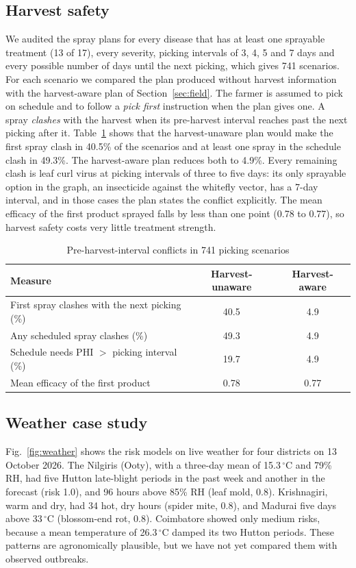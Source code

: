 \documentclass[conference]{IEEEtran}
\begin{document}
\subsection{Harvest safety}
We audited the spray plans for every disease that has at least one sprayable treatment (13 of 17), every severity, picking intervals of 3, 4, 5 and 7 days and every possible number of days until the next picking, which gives 741 scenarios. For each scenario we compared the plan produced without harvest information with the harvest-aware plan of Section~\ref{sec:field}. The farmer is assumed to pick on schedule and to follow a \emph{pick first} instruction when the plan gives one. A spray \emph{clashes} with the harvest when its pre-harvest interval reaches past the next picking after it. Table~\ref{tab:phi} shows that the harvest-unaware plan would make the first spray clash in 40.5\% of the scenarios and at least one spray in the schedule clash in 49.3\%. The harvest-aware plan reduces both to 4.9\%. Every remaining clash is leaf curl virus at picking intervals of three to five days: its only sprayable option in the graph, an insecticide against the whitefly vector, has a 7-day interval, and in those cases the plan states the conflict explicitly. The mean efficacy of the first product sprayed falls by less than one point (0.78 to 0.77), so harvest safety costs very little treatment strength.

\begin{table}[t]
  \caption{Pre-harvest-interval conflicts in 741 picking scenarios}
  \label{tab:phi}
  \centering
  \footnotesize
  \setlength{\tabcolsep}{3pt}
  \begin{tabular}{@{}>{\raggedright\arraybackslash}p{4.3cm}cc@{}}
    \toprule
    Measure & Harvest-unaware & Harvest-aware \\
    \midrule
    First spray clashes with the next picking (\%) & 40.5 & 4.9 \\
    Any scheduled spray clashes (\%) & 49.3 & 4.9 \\
    Schedule needs PHI $>$ picking interval (\%) & 19.7 & 4.9 \\
    Mean efficacy of the first product & 0.78 & 0.77 \\
    \bottomrule
  \end{tabular}
\end{table}

\subsection{Weather case study}
Fig.~\ref{fig:weather} shows the risk models on live weather for four districts on 13 October 2026. The Nilgiris (Ooty), with a three-day mean of 15.3\,$^\circ$C and 79\% RH, had five Hutton late-blight periods in the past week and another in the forecast (risk 1.0), and 96 hours above 85\% RH (leaf mold, 0.8). Krishnagiri, warm and dry, had 34 hot, dry hours (spider mite, 0.8), and Madurai five days above 33\,$^\circ$C (blossom-end rot, 0.8). Coimbatore showed only medium risks, because a mean temperature of 26.3\,$^\circ$C damped its two Hutton periods. These patterns are agronomically plausible, but we have not yet compared them with observed outbreaks.
\end{document}
